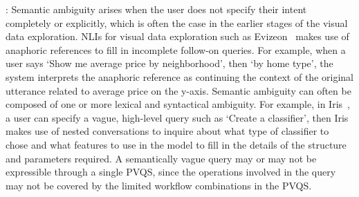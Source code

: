 : Semantic ambiguity arises when the user does not specify their intent completely or explicitly, which is often the case in the earlier stages of the visual data exploration. NLIs for visual data exploration such as Evizeon~\cite{Hoque2017} makes use of anaphoric references to fill in incomplete follow-on queries. For example, when a user says `Show me average price by neighborhood', then `by home type', the system interprets the anaphoric reference as continuing the context of the original utterance related to average price on the y-axis. Semantic ambiguity can often be composed of one or more lexical and syntactical ambiguity. For example, in Iris~\cite{Fast2018}, a user can specify a vague, high-level query such as `Create a classifier', then Iris makes use of nested conversations to inquire about what type of classifier to chose and what features to use in the model to fill in the details of the structure and parameters required. A semantically vague query may or may not be expressible through a single PVQS, since the operations involved in the query may not be covered by the limited workflow combinations in the PVQS. 



 


